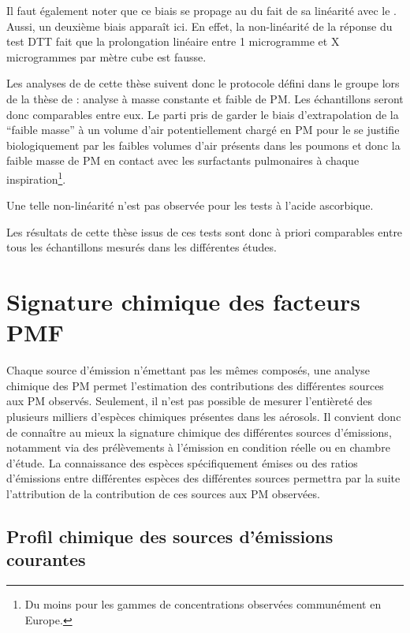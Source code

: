 Il faut également noter que ce biais se propage au \PODTTv{} du fait de sa linéarité avec le
\PODTTm. Aussi, un deuxième biais apparaît ici. En effet, la non-linéarité de la réponse
du test DTT fait
que la prolongation linéaire entre 1 microgramme et X microgrammes par mètre cube est
fausse.

Les analyses de \PODTT{} de cette thèse suivent donc le protocole défini dans le groupe lors de la thèse
de \textcite{calasPollution2017} : analyse à masse constante et faible de PM. Les
échantillons seront donc comparables entre eux. Le parti pris de garder le biais
d'extrapolation de la ``faible masse'' à un volume d'air potentiellement chargé en PM
pour le \PODTTv{} se justifie biologiquement par les faibles volumes d'air présents dans les
poumons et donc la faible masse de PM en contact avec les surfactants pulmonaires à
chaque inspiration\footnote{Du moins pour les gammes de concentrations observées
communément en Europe.}.

Une telle non-linéarité n'est pas observée pour les tests à l'acide ascorbique.

Les résultats de cette thèse issus de ces tests sont donc à priori comparables entre tous les
échantillons mesurés dans les différentes études.


\section{Signature chimique des facteurs PMF}%
\label{sec:signature_chimique_des_facteurs_PMF}

Chaque source d'émission n'émettant pas les mêmes composés, une analyse chimique
des PM permet l'estimation des contributions des différentes sources aux PM observés.
Seulement, il n'est pas possible de mesurer l'entièreté des plusieurs milliers d'espèces chimiques
présentes dans les aérosols.
Il convient donc de connaître au mieux la signature chimique des différentes sources
d'émissions, notamment via des prélèvements à l'émission en condition
réelle ou en chambre d'étude. La connaissance des espèces spécifiquement émises ou des
ratios d'émissions entre différentes espèces des différentes sources permettra par la
suite l'attribution de la contribution de ces sources aux PM observées.

\subsection{Profil chimique des sources d'émissions courantes}%
\label{sub:profil_chimique_des_sources_d_émissions_courantes}

